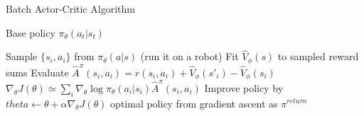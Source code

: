 \begin{algorithm}[t!]
\caption{Batch Actor-Critic Algorithm}
\begin{algorithmic}[1]
\label{alg:batchac}
\REQUIRE Base policy $\pi_\theta(a_t|s_t)$

    \STATE Sample $\{s_i,a_i\}$ from $\pi_\theta(a|s)$ (run it on a robot)
    \STATE Fit $\hat{V}_\phi(s)$ to sampled reward sums
    \STATE Evaluate $\hat{A}^\pi(s_i,a_i) = r(s_i,a_i)+\hat{V}_\phi(s'_i)-\hat{V}_\phi(s_i)$
    \STATE $\nabla_\theta J(\theta) \simeq \sum_i\nabla_\theta\log \pi_\theta(a_i|s_i)\hat{A}^\pi(s_i,a_i)$
    \STATE Improve policy by $theta \leftarrow \theta + \alpha\nabla_\theta J(\theta)$
\ENDWHILE
\RETURN optimal policy from gradient ascent as $\pi^{return}$
\end{algorithmic}
\end{algorithm}